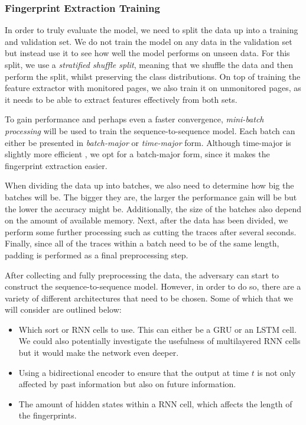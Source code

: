 \subsubsection{Fingerprint Extraction Training} \label{sec:fingerprint-extraction-training}

In order to truly evaluate the model, we need to split the data up into a training and validation set.
We do not train the model on any data in the validation set but instead use it to see how well the model performs on unseen data.
For this split, we use a \textit{stratified shuffle split}, meaning that we shuffle the data and then perform the split, whilst preserving the class distributions.
On top of training the feature extractor with monitored pages, we also train it on unmonitored pages, as it needs to be able to extract features effectively from both sets.

To gain performance and perhaps even a faster convergence, \textit{mini-batch processing} will be used to train the sequence-to-sequence model.
Each batch can either be presented in \textit{batch-major} or \textit{time-major} form.
Although time-major is slightly more efficient \cite{tensorflow}, we opt for a batch-major form, since it makes the fingerprint extraction easier.

When dividing the data up into batches, we also need to determine how big the batches will be.
The bigger they are, the larger the performance gain will be but the lower the accuracy might be.
Additionally, the size of the batches also depend on the amount of available memory.
Next, after the data has been divided, we perform some further processing such as cutting the traces after several seconds.
Finally, since all of the traces within a batch need to be of the same length, padding is performed as a final preprocessing step.

After collecting and fully preprocessing the data, the adversary can start to construct the sequence-to-sequence model.
However, in order to do so, there are a variety of different architectures that need to be chosen.
Some of which that we will consider are outlined below:

\begin{itemize}
  \item Which sort or RNN cells to use. This can either be a GRU or an LSTM cell.
    We could also potentially investigate the usefulness of multilayered RNN cells but it would make the network even deeper.

  \item Using a bidirectional encoder to ensure that the output at time $t$ is not only affected by past information but also on future information.

  \item The amount of hidden states within a RNN cell, which affects the length of the fingerprints.
\end{itemize}

